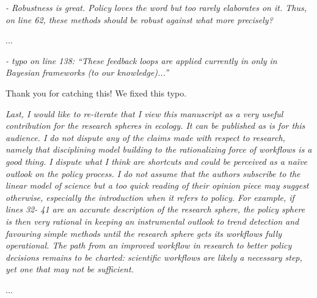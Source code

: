 \documentclass[11pt,letter]{article}
\begin{document}
\begin{mybox}
\emph{- Robustness is great. Policy loves the word but too rarely elaborates on it. Thus, on line 62,
these methods should be robust against what more precisely?}  
\end{mybox}

...

\begin{mybox}
\emph{- typo on line 138: “These feedback loops are applied currently in only in Bayesian
frameworks (to our knowledge)...”}
\end{mybox}

Thank you for catching this! We fixed this typo.

\begin{mybox}
\emph{Last, I would like to re-iterate that I view this manuscript as a very useful contribution for the
research spheres in ecology. It can be published as is for this audience. I do not dispute any of
the claims made with respect to research, namely that disciplining model building to the
rationalizing force of workflows is a good thing. I dispute what I think are shortcuts and could
be perceived as a naïve outlook on the policy process. I do not assume that the authors
subscribe to the linear model of science but a too quick reading of their opinion piece may
suggest otherwise, especially the introduction when it refers to policy. For example, if lines 32-
41 are an accurate description of the research sphere, the policy sphere is then very rational in
keeping an instrumental outlook to trend detection and favouring simple methods until the
research sphere gets its workflows fully operational. The path from an improved workflow in
research to better policy decisions remains to be charted: scientific workflows are likely a
necessary step, yet one that may not be sufficient.}
\end{mybox}

...
\end{document}
